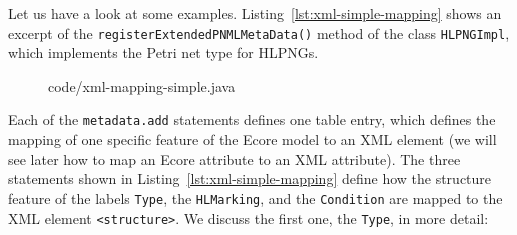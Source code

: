 Let us have a look at some examples. Listing~\ref{lst:xml-simple-mapping} shows
an excerpt of the {\tt registerExtendedPNMLMetaData()}%
   method of the class {\tt HLPNGImpl},
  which implements the Petri net type for HLPNGs.
%
\begin{figure}[htbp!]
%
{code/xml-mapping-simple.java}
\end{figure}
%
Each of the {\tt metadata.add} statements defines one table entry, which
defines the mapping of one specific feature of the Ecore model to an
XML element (we will see later how to map an Ecore attribute to an XML
attribute). The three statements shown in Listing~\ref{lst:xml-simple-mapping}
define how the structure feature of the labels {\tt Type}, the {\tt HLMarking},
and the {\tt Condition} are mapped to the XML element {\tt \verb+<structure>+}.
We discuss the first one, the {\tt Type}, in more detail:
